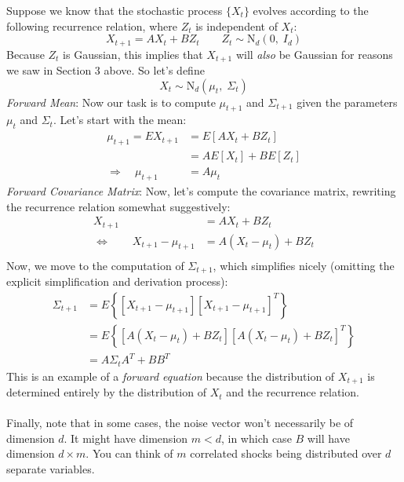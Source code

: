 \documentclass[12pt]{article}
\theoremstyle{plain}
\theoremstyle{definition}
\theoremstyle{remark}
\begin{document}
Suppose we know that the stochastic process $\{{X}_t\}$
evolves according to the following recurrence relation,
where ${Z}_t$ is independent of ${X}_t$:
\begin{equation}
    {X}_{t+1} = A {X}_t + B {Z}_t
    \qquad {Z}_t \sim \text{N}_d(0, \; I_d)
\end{equation}
Because ${Z}_t$ is Gaussian, this implies that
${X}_{t+1}$ will \emph{also} be Gaussian for reasons we saw
in Section 3 above. So let's define
\begin{equation}
    {X}_t \sim \text{N}_d(\mu_t, \; \Sigma_t)
\end{equation}
{\sl Forward Mean}:
Now our task is to compute $\mu_{t+1}$ and $\Sigma_{t+1}$
given the parameters $\mu_t$ and $\Sigma_t$.  Let's start with the
mean:
\begin{align*}
    \mu_{t+1} = E{X}_{t+1} &= E\left[A{X}_t +
	B {Z}_t\right] \\
    &= AE[{X}_t] + BE[{Z}_t] \\
    \Rightarrow \quad \mu_{t+1} &= A\mu_t
\end{align*}
{\sl Forward Covariance Matrix}:
Now, let's compute the covariance matrix, rewriting the recurrence
relation somewhat suggestively:
\begin{align*}
    {X}_{t+1} &= A {X}_t + B {Z}_t \\
    \Leftrightarrow \qquad
	{X}_{t+1} - \mu_{t+1} &=
	A ({X}_t - \mu_t) + B {Z}_t \\
\end{align*}
Now, we move to the computation of $\Sigma_{t+1}$, which simplifies
nicely (omitting the explicit simplification and derivation process):
\begin{align*}
    \Sigma_{t+1} &= E\left\{ \left[{X}_{t+1} - \mu_{t+1} \right]
    \left[{X}_{t+1} - \mu_{t+1} \right]^T \right\} \\
    &= E\left\{ \left[A ({X}_t - \mu_t) + B {Z}_t\right]
	\left[A ({X}_t - \mu_t) + B {Z}_t\right]^T
	\right\} \\
    &= A\Sigma_t A^T + BB^T
\end{align*}
This is an example of a \emph{forward equation} because the
distribution of ${X}_{t+1}$ is determined entirely by
the distribution of ${X}_t$ and the recurrence relation.
\\
\\
Finally, note that in some cases, the noise vector won't necessarily
be of dimension $d$.  It might have dimension $m<d$, in which
case $B$ will have dimension $d\times m$. You can think of
$m$ correlated shocks being distributed over $d$ separate variables.
\end{document}
